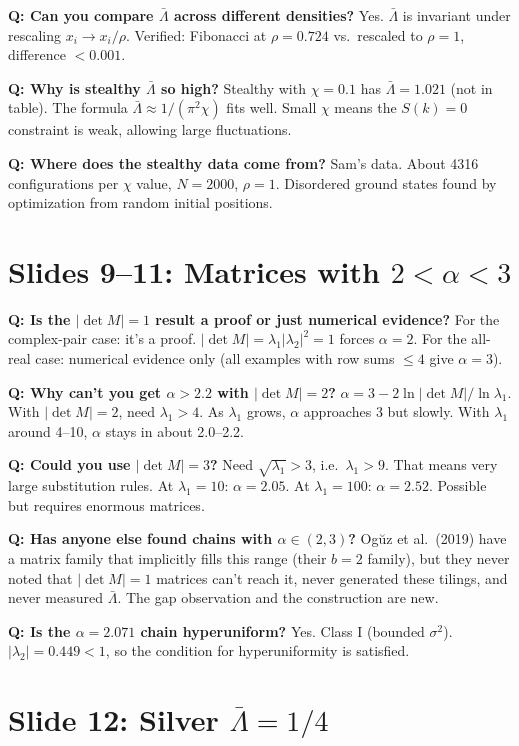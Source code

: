 \documentclass[11pt]{article}
\newcommand{\Q}[1]{\textcolor{qcolor}{\textbf{Q: #1}}}
\begin{document}
\Q{Can you compare $\bar\Lambda$ across different densities?}
Yes. $\bar\Lambda$ is invariant under rescaling $x_i \to x_i/\rho$. Verified: Fibonacci at $\rho=0.724$ vs.\ rescaled to $\rho=1$, difference $<0.001$.

\Q{Why is stealthy $\bar\Lambda$ so high?}
Stealthy with $\chi=0.1$ has $\bar\Lambda = 1.021$ (not in table). The formula $\bar\Lambda \approx 1/(\pi^2\chi)$ fits well. Small $\chi$ means the $S(k)=0$ constraint is weak, allowing large fluctuations.

\Q{Where does the stealthy data come from?}
Sam's data. About 4316 configurations per $\chi$ value, $N=2000$, $\rho=1$. Disordered ground states found by optimization from random initial positions.

\section{Slides 9--11: Matrices with $2 < \alpha < 3$}

\Q{Is the $|\det M|=1$ result a proof or just numerical evidence?}
For the complex-pair case: it's a proof. $|\det M| = \lambda_1|\lambda_2|^2 = 1$ forces $\alpha=2$. For the all-real case: numerical evidence only (all examples with row sums $\leq4$ give $\alpha=3$).

\Q{Why can't you get $\alpha > 2.2$ with $|\det M|=2$?}
$\alpha = 3 - 2\ln|\det M|/\ln\lambda_1$. With $|\det M|=2$, need $\lambda_1 > 4$. As $\lambda_1$ grows, $\alpha$ approaches 3 but slowly. With $\lambda_1$ around 4--10, $\alpha$ stays in about 2.0--2.2.

\Q{Could you use $|\det M|=3$?}
Need $\sqrt{\lambda_1} > 3$, i.e.\ $\lambda_1 > 9$. That means very large substitution rules. At $\lambda_1=10$: $\alpha = 2.05$. At $\lambda_1=100$: $\alpha = 2.52$. Possible but requires enormous matrices.

\Q{Has anyone else found chains with $\alpha\in(2,3)$?}
Og\u{u}z et al.\ (2019) have a matrix family that implicitly fills this range (their $b=2$ family), but they never noted that $|\det M|=1$ matrices can't reach it, never generated these tilings, and never measured $\bar\Lambda$. The gap observation and the construction are new.

\Q{Is the $\alpha=2.071$ chain hyperuniform?}
Yes. Class I (bounded $\sigma^2$). $|\lambda_2| = 0.449 < 1$, so the condition for hyperuniformity is satisfied.

\section{Slide 12: Silver $\bar\Lambda = 1/4$}
\end{document}
